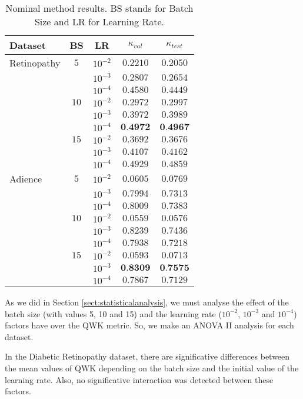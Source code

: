 \documentclass[journal]{IEEEtran}
\begin{document}
	\begin{table}[!t]
		\caption{Nominal method results. BS stands for Batch Size and LR for Learning Rate.}
		\label{table:NominalResults}
		\footnotesize
		\centering
		\begin{tabular}{lcc|cc}
			Dataset & BS & LR & $\kappa_{val}$ & $\kappa_{test}$\\\hline
			Retinopathy & $5$ & $10^{-2}$ & $0.2210$ & $0.2050$\\
			 & & $10^{-3}$ & $0.2807$ & $0.2654$\\
			 & & $10^{-4}$ & $0.4580$ & $0.4449$\\
			
			 & $10$ & $10^{-2}$ & $0.2972$ & $0.2997$\\
			 &  & $10^{-3}$ & $0.3972$ & $0.3989$\\
			 &  & $10^{-4}$ & $\textbf{0.4972}$ & $\textbf{0.4967}$\\
			
			 & $15$ & $10^{-2}$ & $0.3692$ & $0.3676$\\
			 & & $10^{-3}$ & $0.4107$ & $0.4162$\\
			 & & $10^{-4}$ & $0.4929$ & $0.4859$\\
			\hline
			Adience & $5$ & $10^{-2}$ & $0.0605$ & $0.0769$\\
			 & & $10^{-3}$ & $0.7994$ & $0.7313$\\
			 & & $10^{-4}$ & $0.8009$ & $0.7383$\\
			
			 & $10$ & $10^{-2}$ & $0.0559$ & $0.0576$\\
			 & & $10^{-3}$ & $0.8239$ & $0.7436$\\
			 & & $10^{-4}$ & $0.7938$ & $0.7218$\\
			
			 & $15$ & $10^{-2}$ & $0.0593$ & $0.0713$\\
			 & & $10^{-3}$ & $\textbf{0.8309}$ & $\textbf{0.7575}$\\
			 & & $10^{-4}$ & $0.7867$ & $0.7129$\\
		\end{tabular}
	\end{table}
	
	As we did in Section \ref{sect:statisticalanalysis}, we must analyse the effect of the batch size (with values 5, 10 and 15) and the learning rate ($10^{-2}$, $10^{-3}$ and $10^{-4}$) factors have over the QWK metric. So, we make an ANOVA II analysis for each dataset.
	
	In the Diabetic Retinopathy dataset, there are significative differences between the mean values of QWK depending on the batch size and the initial value of the learning rate. Also, no significative interaction was detected between these factors.
	
\end{document}
